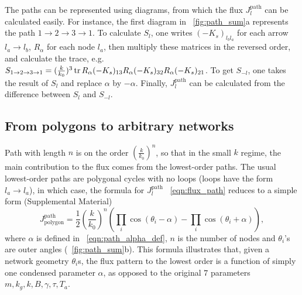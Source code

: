 \documentclass[
 preprint,
 preprintnumbers,
 amsmath,amssymb,
 aps,
 pre,
 longbibliography,
 superscriptaddress,
 10pt, twocolumn
]{revtex4-1}
\begin{document}
The paths can be represented using diagrams, from which the flux $J^\text{path}_l$ can be calculated easily. For instance, the first diagram in \figurename~\ref{fig:path_sum}a represents the path $1\rightarrow 2\rightarrow 3\rightarrow 1$. To calculate $S_l$, one writes $(-K_s)_{l_bl_a}$ for each arrow $l_a\rightarrow l_b$, $R_\alpha$ for each node $l_a$, then multiply these matrices in the reversed order, and calculate the trace, e.g. $S_{1\rightarrow 2\rightarrow 3\rightarrow 1} = (\frac{k}{k_0})^3 \tr R_\alpha (-K_s)_{13} R_\alpha (-K_s)_{32} R_\alpha (-K_s)_{21}$. To get $S_{-l}$, one takes the result of $S_l$ and replace $\alpha$ by $-\alpha$. Finally, $J^\text{path}_l$ can be calculated from the difference between $S_l$ and $S_{-l}$.

\subsection{From polygons to arbitrary networks}
Path with length $n$ is on the order $(\frac{k}{k_0})^n$, so that in the small $k$ regime, the main contribution to the flux comes from the lowest-order paths.
The usual lowest-order paths are polygonal cycles with no loops (loops have the form $l_a\rightarrow l_a$), in which case, the formula for $J^\text{path}_l$ \eqnname~\eqref{eqn:flux_path} reduces to a simple form (Supplemental Material)
\begin{equation} \label{eqn:flux_path_polygon}
    J^\text{path}_\text{polygon} = \frac{1}{2} (\frac{k}{k_0})^n (\prod_i \cos(\theta_i - \alpha) - \prod_i \cos(\theta_i + \alpha)),
\end{equation}
where $\alpha$ is defined in \eqnname~\eqref{eqn:path_alpha_def}, $n$ is the number of nodes and $\theta_i$'s are outer angles (\figurename~\ref{fig:path_sum}b).
This formula illustrates that, given a network geometry $\theta_i$s, the flux pattern to the lowest order is a function of simply one condensed parameter $\alpha$, as opposed to the original $7$  parameters $m, k_g, k, B, \gamma, \tau, T_a$.
\end{document}
